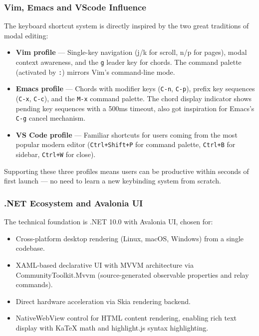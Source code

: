\documentclass[14pt]{article}
\begin{document}
\subsubsection{Vim, Emacs and VScode Influence}
\label{sec:orga621120}
The keyboard shortcut system is directly inspired by the two great
traditions of modal editing:

\begin{itemize}
\item \textbf{\textbf{Vim profile}} — Single-key navigation (j/k for scroll, n/p for
pages), modal context awareness, and the \texttt{g} leader key for chords.
The command palette (activated by \texttt{:}) mirrors Vim's command-line
mode.

\item \textbf{\textbf{Emacs profile}} — Chords with modifier keys (\texttt{C-n}, \texttt{C-p}), prefix
key sequences (\texttt{C-x}, \texttt{C-c}), and the \texttt{M-x} command palette. The
chord display indicator shows pending key sequences with a 500ms
timeout, also got inspiration for Emacs's \texttt{C-g} cancel mechanism.

\item \textbf{\textbf{VS Code profile}} — Familiar shortcuts for users coming from the
most popular modern editor (\texttt{Ctrl+Shift+P} for command palette,
\texttt{Ctrl+B} for sidebar, \texttt{Ctrl+W} for close).
\end{itemize}

Supporting these three profiles means users can be productive within
seconds of first launch — no need to learn a new keybinding system from
scratch.

\newpage
\subsubsection{.NET Ecosystem and Avalonia UI}
\label{sec:org2fab91f}
The technical foundation is .NET 10.0 with Avalonia UI, chosen for:

\begin{itemize}
\item Cross-platform desktop rendering (Linux, macOS, Windows) from a single
codebase.
\item XAML-based declarative UI with MVVM architecture via
CommunityToolkit.Mvvm (source-generated observable properties and
relay commands).
\item Direct hardware acceleration via Skia rendering backend.
\item NativeWebView control for HTML content rendering, enabling rich
text display with KaTeX math and highlight.js syntax highlighting.
\end{itemize}
\end{document}
